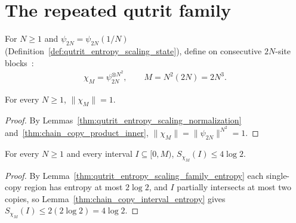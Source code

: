 \section{The repeated qutrit family}

\begin{definition}
    \label{def:qutrit_entropy_scaling_copies}
    \leanok
    For $N\ge1$ and $\psi_{2N}=\psi_{2N}(1/N)$
    (Definition~\ref{def:qutrit_entropy_scaling_state}), define on consecutive
    $2N$-site blocks~\cite[lines 421--425]{Schuch2008EntropyScaling}:
    \begin{align}
        \label{eq:qutrit_entropy_scaling_copies}
        \chi_M=\psi_{2N}^{\otimes N^2},\qquad M=N^2(2N)=2N^3.
    \end{align}
\end{definition}

\begin{lemma}
    \label{thm:qutrit_entropy_scaling_copies_norm}
    \leanok
    For every $N\ge1$, $\|\chi_M\|=1$.
\end{lemma}
\begin{proof}\leanok
    By Lemmas~\ref{thm:qutrit_entropy_scaling_normalization}
    and~\ref{thm:chain_copy_product_inner},
    $\|\chi_M\|=\|\psi_{2N}\|^{N^2}=1$.
\end{proof}

\begin{lemma}
    \label{thm:qutrit_entropy_scaling_copies_entropy}
    \leanok
    For every $N\ge1$ and every interval $I\subseteq[0,M)$,
    $S_{\chi_M}(I)\le4\log2$.
\end{lemma}
\begin{proof}\leanok
    By Lemma~\ref{thm:qutrit_entropy_scaling_family_entropy} each single-copy
    region has entropy at most $2\log2$, and $I$ partially intersects at most
    two copies, so Lemma~\ref{thm:chain_copy_interval_entropy} gives
    $S_{\chi_M}(I)\le2(2\log2)=4\log2$.
\end{proof}

